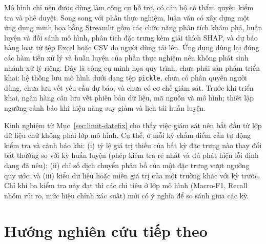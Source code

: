 Mô hình chỉ nên được dùng làm công cụ hỗ trợ, có cán bộ có thẩm quyền kiểm tra và phê duyệt. Song song với phần thực nghiệm, luận văn có xây dựng một ứng dụng minh họa bằng Streamlit gồm các chức năng phân tích khám phá, huấn luyện và đối sánh mô hình, phân tích đặc trưng kèm giải thích SHAP, và dự báo hàng loạt từ tệp Excel hoặc CSV do người dùng tải lên. Ứng dụng dùng lại đúng các hàm tiền xử lý và huấn luyện của phần thực nghiệm nên không phát sinh nhánh xử lý riêng. Đây là công cụ minh họa quy trình, chưa phải sản phẩm triển khai: hệ thống lưu mô hình dưới dạng tệp \texttt{pickle}, chưa có phân quyền người dùng, chưa lưu vết yêu cầu dự báo, và chưa có cơ chế giám sát. Trước khi triển khai, ngân hàng cần lưu vết phiên bản dữ liệu, mã nguồn và mô hình; thiết lập ngưỡng cảnh báo khi hiệu năng suy giảm và lịch tái huấn luyện.

Kinh nghiệm từ Mục~\ref{sec:limit-datefix} cho thấy việc giám sát nên bắt đầu từ lớp dữ liệu chứ không phải lớp mô hình. Cụ thể, ở mỗi kỳ chấm điểm cần tự động kiểm tra và cảnh báo khi: (i) tỷ lệ giá trị thiếu của bất kỳ đặc trưng nào thay đổi bất thường so với kỳ huấn luyện (phép kiểm tra rẻ nhất và đủ phát hiện lỗi định dạng đã nêu); (ii) chỉ số dịch chuyển phân bố của một đặc trưng vượt ngưỡng quy ước; và (iii) kiểu dữ liệu hoặc miền giá trị của một trường khác với kỳ trước. Chỉ khi ba kiểm tra này đạt thì các chỉ tiêu ở lớp mô hình (Macro-F1, Recall nhóm rủi ro, mức hiệu chỉnh xác suất) mới có ý nghĩa để so sánh giữa các kỳ.

\section{Hướng nghiên cứu tiếp theo}

